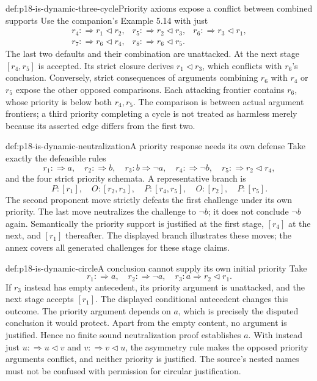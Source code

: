 \begin{hbexample}{def:p18-is-dynamic-three-cycle}{Priority axioms expose a conflict between combined supports}
Use the companion's Example 5.14 with just
\[
\begin{array}{lll}
r_4:\Rightarrow r_1\triangleleft r_2,&
r_5:\Rightarrow r_2\triangleleft r_3,&
r_6:\Rightarrow r_3\triangleleft r_1,\\
r_7:\Rightarrow r_6\triangleleft r_4,&
r_8:\Rightarrow r_6\triangleleft r_5.&
\end{array}
\]
The last two defaults and their combination are unattacked.
At the next stage \([r_4,r_5]\) is accepted.
Its strict closure derives \(r_1\triangleleft r_3\), which conflicts
with \(r_6\)'s conclusion. Conversely, strict consequences of
arguments combining \(r_6\) with \(r_4\) or \(r_5\) expose the
other opposed comparisons. Each attacking frontier contains
\(r_6\), whose priority is below both \(r_4,r_5\).
The comparison is between actual argument frontiers; a third
priority completing a cycle is not treated as harmless merely
because its asserted edge differs from the first two.
\end{hbexample}

\begin{hbexample}{def:p18-is-dynamic-neutralization}{A priority response needs its own defense}
Take exactly the defeasible rules
\[
r_1:\Rightarrow a,\quad r_2:\Rightarrow b,\quad
r_3:b\Rightarrow\neg a,\quad r_4:\Rightarrow\neg b,\quad
r_5:\Rightarrow r_2\triangleleft r_4,
\]
and the four strict priority schemata.
A representative branch is
\[
P:[r_1],\quad O:[r_2,r_3],\quad
P:[r_4,r_5],\quad O:[r_2],\quad P:[r_5].
\]
The second proponent move strictly defeats the first challenge
under its own priority. The last move neutralizes the challenge
to \(\neg b\); it does not conclude \(\neg b\) again.
Semantically the priority support is justified at the first stage,
\([r_4]\) at the next, and \([r_1]\) thereafter.
The displayed branch illustrates these moves; the annex covers
all generated challenges for these stage claims.
\end{hbexample}

\begin{hbexample}{def:p18-is-dynamic-circle}{A conclusion cannot supply its own initial priority}
Take
\[
r_1:\Rightarrow a,\quad r_2:\Rightarrow\neg a,\quad
r_3:a\Rightarrow r_2\triangleleft r_1.
\]
If \(r_3\) instead has empty antecedent, its priority argument
is unattacked, and the next stage accepts \([r_1]\).
The displayed conditional antecedent changes this outcome.
The priority argument depends on \(a\), which is precisely the
disputed conclusion it would protect. Apart from the empty content,
no argument is justified. Hence no finite sound neutralization
proof establishes \(a\). With instead just
\(u:\Rightarrow u\triangleleft v\) and
\(v:\Rightarrow v\triangleleft u\), the asymmetry rule makes the
opposed priority arguments conflict, and neither priority is
justified. The source's nested names must not be confused with
permission for circular justification.
\end{hbexample}

